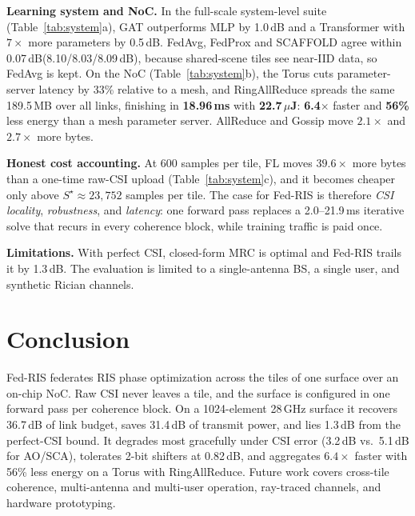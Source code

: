 \documentclass[conference]{IEEEtran}
\newcommand{\fedris}{Fed-RIS\xspace}
\newcommand{\dB}{\,dB\xspace}
\begin{document}
\textbf{Learning system and NoC.} In the full-scale system-level suite (Table~\ref{tab:system}a), GAT outperforms MLP by 1.0\dB and a Transformer with $7\times$ more parameters by 0.5\dB. FedAvg, FedProx and SCAFFOLD agree within 0.07\dB (8.10/8.03/8.09\dB), because shared-scene tiles see near-IID data, so FedAvg is kept. On the NoC (Table~\ref{tab:system}b), the Torus cuts parameter-server latency by 33\% relative to a mesh, and RingAllReduce spreads the same 189.5\,MB over all links, finishing in \textbf{18.96\,ms} with \textbf{22.7\,$\mu$J}: \textbf{6.4$\times$} faster and \textbf{56\%} less energy than a mesh parameter server. AllReduce and Gossip move $2.1\times$ and $2.7\times$ more bytes.

\textbf{Honest cost accounting.} At 600 samples per tile, FL moves $39.6\times$ more bytes than a one-time raw-CSI upload (Table~\ref{tab:system}c), and it becomes cheaper only above $S^\star\approx23{,}752$ samples per tile. The case for \fedris is therefore \emph{CSI locality}, \emph{robustness}, and \emph{latency}: one forward pass replaces a 2.0--21.9\,ms iterative solve that recurs in every coherence block, while training traffic is paid once.

\textbf{Limitations.} With perfect CSI, closed-form MRC is optimal and \fedris trails it by 1.3\dB. The evaluation is limited to a single-antenna BS, a single user, and synthetic Rician channels.

\section{Conclusion}

\fedris federates RIS phase optimization across the tiles of one surface over an on-chip NoC. Raw CSI never leaves a tile, and the surface is configured in one forward pass per coherence block. On a 1024-element 28\,GHz surface it recovers 36.7\dB of link budget, saves 31.4\dB of transmit power, and lies 1.3\dB from the perfect-CSI bound. It degrades most gracefully under CSI error (3.2\dB vs.\ 5.1\dB for AO/SCA), tolerates 2-bit shifters at 0.82\dB, and aggregates $6.4\times$ faster with 56\% less energy on a Torus with RingAllReduce. Future work covers cross-tile coherence, multi-antenna and multi-user operation, ray-traced channels, and hardware prototyping.
\end{document}
